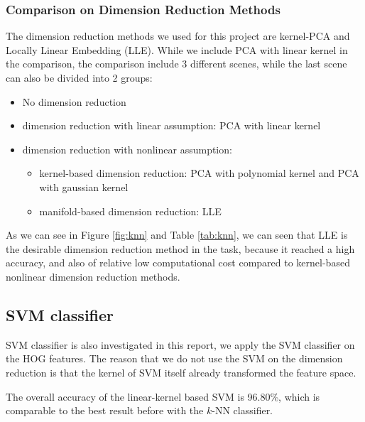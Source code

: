 \documentclass[12pt]{article}
\begin{document}
\subsubsection{Comparison on Dimension Reduction Methods}
The dimension reduction methods we used for this project are kernel-PCA and Locally Linear Embedding (LLE). While we include PCA with linear kernel in the comparison, the comparison include 3 different scenes, while the last scene can also be divided into 2 groups:
\begin{itemize}
	\item No dimension reduction
	\item dimension reduction with linear assumption: PCA with linear kernel
	\item dimension reduction with nonlinear assumption:
	\begin{itemize}
		\item kernel-based dimension reduction: PCA with polynomial kernel and PCA with gaussian kernel
		\item manifold-based dimension reduction: LLE
	\end{itemize}
\end{itemize}

As we can see in Figure \ref{fig:knn} and Table \ref{tab:knn}, we can seen that LLE is the desirable dimension reduction method in the task, because it reached a high accuracy, and also of relative low computational cost compared to kernel-based nonlinear dimension reduction methods.

\subsection{SVM classifier}

SVM classifier is also investigated in this report, we apply the SVM classifier on the HOG features. The reason that we do not use the SVM on the dimension reduction is that the kernel of SVM itself already transformed the feature space.

The overall accuracy of the linear-kernel based SVM is 96.80\%, which is comparable to the best result before with the $k$-NN classifier.
\end{document}

